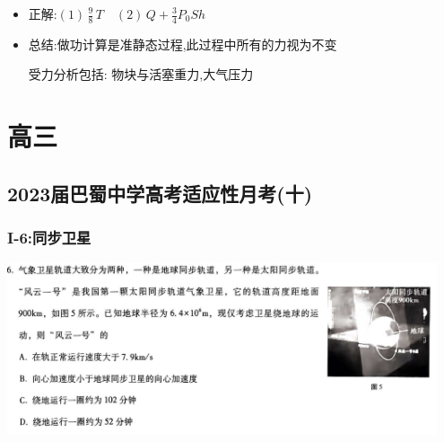 \documentclass{article}
\begin{document}
\begin{itemize}
    \item 正解:\quad $(1) \, \frac{9}{8} \, T \quad (2) \,  Q + \frac{3}{4}P_{0}Sh$
    \item 总结:\quad 做功计算是准静态过程,此过程中所有的力视为不变
    
    \hspace{3.2em}受力分析包括: 物块与活塞重力,大气压力
\end{itemize}

\vspace{2em}



\section{高三}

\subsection{2023届巴蜀中学高考适应性月考(十)}
\subsubsection{I-6:同步卫星}
\includegraphics[width = 0.95\textwidth,keepaspectratio]{./pictures/3.1-1.png}
\end{document}
